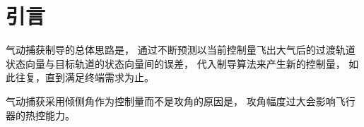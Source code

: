 \section{引\quad 言}
气动捕获制导的总体思路是，
通过不断预测以当前控制量飞出大气后的过渡轨道状态向量与目标轨道的状态向量间的误差，
代入制导算法来产生新的控制量，
如此往复，直到满足终端需求为止。

气动捕获采用倾侧角作为控制量而不是攻角的原因是，
攻角幅度过大会影响飞行器的热控能力。
